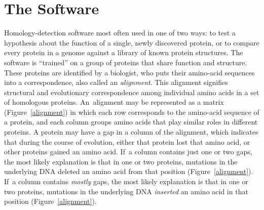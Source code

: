 \documentclass[preprint,nonatbib,blockstyle,nocopyrightspace,times]{sigplanconf}
\newcommand\figref[1]{Figure~\ref{#1}}
\newcommand\seclabel[1]{\label{sec:#1}}
\begin{document}




\section{The Software}


\seclabel{viterbi}

Homology-detection software most often used in one of two ways:
to test a hypothesis about 
the function of a single, newly discovered protein, or 
to compare every protein in a genome against a library of known protein 
structures.
The software is ``trained'' 
on a group of proteins that share function and structure.
These proteins are identified by a biologist, who puts
their amino-acid sequences into a correspondence, also called an
\emph{alignment}. This alignment signifies structural and evolutionary
correspondence among individual amino acids in a set of homologous proteins.
An~alignment may be represented as a matrix
(Figure~\ref{alignment}) 
in which each row corresponds to the amino-acid sequence of a protein,
and each column groups amino acids that play similar roles in
different proteins.
A protein may have a gap in a column of the alignment, which indicates
that during the course of evolution, either that protein lost that amino
acid, or other proteins gained an amino acid.
If~a column contains just one or two gaps, the most likely explanation
is that in one or two proteins, mutations in the underlying DNA
deleted an amino acid from that position (\figref{alignment}).
If~a column contains \emph{mostly} gaps, 
the most likely explanation
is that in one or two proteins, mutations in the underlying DNA
\emph{inserted} an amino acid in that position (\figref{alignment}).
\end{document}
